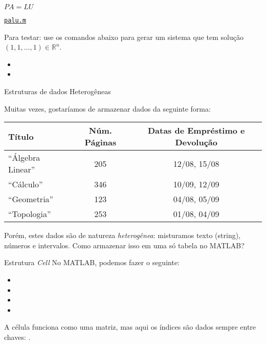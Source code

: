 \documentclass[hyperref={pdfpagelabels=false}]{beamer}
\begin{document}
\begin{frame}{$PA=LU$}
   \begin{center}
     \href{listings/palu.m}{\underline{\texttt{palu.m}}}
   \end{center}
   Para testar: use os comandos abaixo para gerar um sistema que tem solução $(1,1,\ldots,1) \in {\mathbb{R}}^n$.
   \begin{itemize}
      \item[\ttfamily{>>}] 
      \item[\ttfamily{>>}] 
   \end{itemize}
\end{frame}

\begin{frame}{Estruturas de dados Heterogêneas}

   Muitas vezes, gostaríamos de armazenar dados da seguinte forma:
   \begin{center}
     \footnotesize{%
       \begin{tabular}{l c c}
         Título & Núm. Páginas & Datas de Empréstimo e Devolução\\\toprule
         ``Álgebra Linear'' & 205 & 12/08, 15/08\\
         ``Cálculo'' & 346 & 10/09, 12/09\\
         ``Geometria'' & 123 & 04/08, 05/09\\
         ``Topologia'' & 253 & 01/08, 04/09
       \end{tabular}
       }
   \end{center}

   Porém, estes dados são de natureza \emph{heterogênea}: misturamos texto (string), números e intervalos. Como armazenar isso em uma só tabela no MATLAB?
\end{frame}

\begin{frame}{Estrutura \emph{Cell}}
   No MATLAB, podemos fazer o seguinte:
   \begin{itemize}
      \item[\ttfamily{>>}] 
      \item[\ttfamily{>>}] 
      \item[\ttfamily{>>}] 
      \item[\ttfamily{>>}] 
   \end{itemize}
   A célula funciona como uma matriz, mas aqui os índices são dados sempre entre chaves: \ttfamily{\{\}}.
\end{frame}
\end{document}
